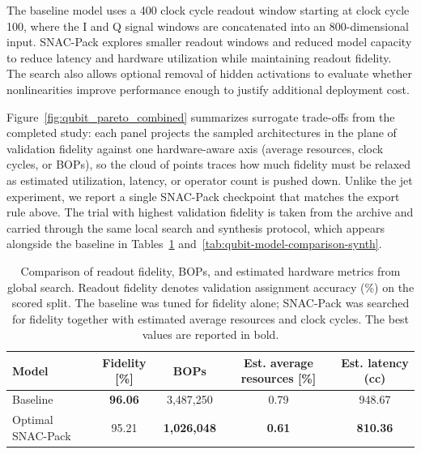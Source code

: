 \documentclass[11pt]{article}
\begin{document}
The baseline model uses a 400 clock cycle readout window starting at clock cycle 100, where the I and Q signal windows are concatenated into an 800-dimensional input.
SNAC-Pack explores smaller readout windows and reduced model capacity to reduce latency and hardware utilization while maintaining readout fidelity.
The search also allows optional removal of hidden activations to evaluate whether nonlinearities improve performance enough to justify additional deployment cost.

Figure~\ref{fig:qubit_pareto_combined} summarizes surrogate trade-offs from the completed study: each panel projects the sampled architectures in the plane of validation fidelity against one hardware-aware axis (average resources, clock cycles, or BOPs), so the cloud of points traces how much fidelity must be relaxed as estimated utilization, latency, or operator count is pushed down.
Unlike the jet experiment, we report a single SNAC-Pack checkpoint that matches the export rule above. The trial with highest validation fidelity is taken from the archive and carried through the same local search and synthesis protocol, which appears alongside the baseline in Tables~\ref{tab:qubit-global-comparison} and~\ref{tab:qubit-model-comparison-synth}.

\begin{table}[t]
  \caption{Comparison of readout fidelity, BOPs, and estimated hardware metrics from global search.
  Readout fidelity denotes validation assignment accuracy (\%) on the scored split.
  The baseline was tuned for fidelity alone; SNAC-Pack was searched for fidelity together with estimated average resources and clock cycles.
  The best values are reported in bold.}
  \label{tab:qubit-global-comparison}
  \centering
  \footnotesize
  \begin{tabular}{lcccc}
    \toprule
    Model & Fidelity [\%] & BOPs & Est. average resources [\%] & Est. latency (cc) \\
    \midrule
    Baseline \cite{diguglielmo2025endtoendworkflowmachinelearningbased} & \textbf{96.06} & 3{,}487{,}250 & 0.79 & 948.67 \\
    Optimal SNAC-Pack & 95.21 & \textbf{1{,}026{,}048} & \textbf{0.61} & \textbf{810.36} \\
    \bottomrule
  \end{tabular}
\end{table}
\end{document}
